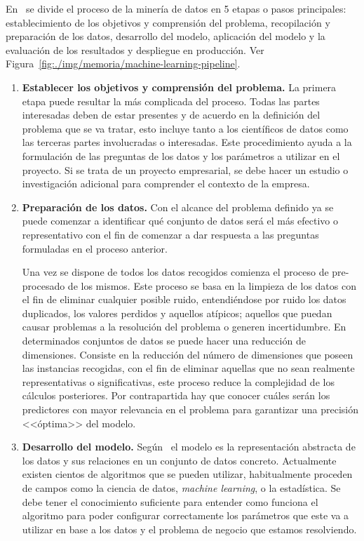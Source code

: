 En~\cite{KOTU201517} se divide el proceso de la minería de datos en 5 etapas o pasos principales: establecimiento de los objetivos y comprensión del problema, recopilación y preparación de los datos, desarrollo del modelo, aplicación del modelo y la evaluación de los resultados y despliegue en producción. Ver Figura~\ref{fig:./img/memoria/machine-learning-pipeline}.


\begin{enumerate}
   \item \textbf{Establecer los objetivos y comprensión del problema.}
    La primera etapa puede resultar la más complicada del proceso. Todas las partes interesadas deben de estar presentes y de acuerdo en la definición del problema que se va tratar, esto incluye tanto a los científicos de datos como las terceras partes involucradas o interesadas. 
    Este procedimiento ayuda a la formulación de las preguntas de los datos y los parámetros a utilizar en el proyecto. Si se trata de un proyecto empresarial, se debe hacer un estudio o investigación adicional para comprender el contexto de la empresa.
    \item \textbf{Preparación de los datos.}
    Con el alcance del problema definido ya se puede comenzar a identificar qué conjunto de datos será el más efectivo o representativo con el fin de comenzar a dar respuesta a las preguntas formuladas en el proceso anterior.
    
    Una vez se dispone de todos los datos recogidos comienza el proceso de pre-procesado de los mismos. Este proceso se basa en la limpieza de los datos con el fin de eliminar cualquier posible ruido, entendiéndose por ruido los datos duplicados, los valores perdidos y aquellos atípicos; aquellos que puedan causar problemas a la resolución del problema o generen incertidumbre.
    En determinados conjuntos de datos se puede hacer una reducción de dimensiones. Consiste en la reducción del número de dimensiones que poseen las instancias recogidas, con el fin de eliminar aquellas que no sean realmente representativas o significativas, este proceso reduce la complejidad de los cálculos posteriores. Por contrapartida hay que conocer cuáles serán los predictores con mayor relevancia en el problema para garantizar una precisión <<óptima>> del modelo.
    \item \textbf{Desarrollo del modelo.}
    Según~\cite{KOTU201517} el modelo es la representación abstracta de los datos y sus relaciones en un conjunto de datos concreto. Actualmente existen cientos de algoritmos que se pueden utilizar, habitualmente proceden de campos como la ciencia de datos, \textit{machine learning}, o la estadística.
    Se debe tener el conocimiento suficiente para entender como funciona el algoritmo para poder configurar correctamente los parámetros que este va a utilizar en base a los datos y el problema de negocio que estamos resolviendo. 
    

\end{enumerate}
